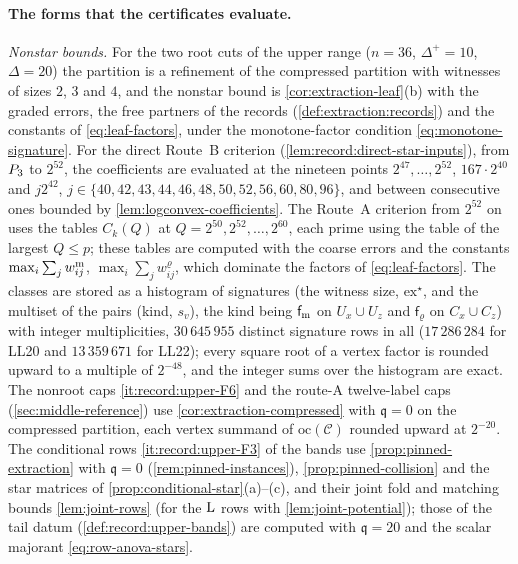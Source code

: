 \paragraph{The forms that the certificates evaluate.}
\emph{Nonstar bounds.} For the two root cuts of the upper range ($n=36$,
$\Delta^+=10$, $\Delta=20$) the partition is a refinement of the compressed
partition with witnesses of sizes $2$, $3$ and $4$, and the nonstar bound is
\cref{cor:extraction-leaf}(b) with the graded errors, the free partners of the
records (\cref{def:extraction:records}) and the constants of \eqref{eq:leaf-factors},
under the monotone-factor condition \eqref{eq:monotone-signature}. For the direct
Route~B criterion (\cref{lem:record:direct-star-inputs}), from $P_3$ to
$2^{52}$, the coefficients are evaluated at the nineteen points $2^{47},\dots,2^{52}$,
$167\cdot2^{40}$ and $j2^{42}$, $j\in\{40,42,43,44,46,48,50,52,56,60,80,96\}$, and
between consecutive ones bounded by \cref{lem:logconvex-coefficients}. The
Route~A criterion from $2^{52}$ on uses the tables $C_k(Q)$ at
$Q=2^{50},2^{52},\dots,2^{60}$, each prime using the table of the largest $Q\le p$;
these tables are computed with the coarse errors and the constants
$\max_i\sum_jw^{\rm m}_{ij}$, $\max_i\sum_jw^\varrho_{ij}$, which dominate the factors of
\eqref{eq:leaf-factors}.
The classes are stored as a histogram of signatures (the witness size,
$\mathrm{ex}^\star$, and the multiset of the pairs (kind, $s_v$), the kind being
$\mathsf f_{\rm m}$ on $U_x\cup U_z$ and $\mathsf f_\varrho$ on $C_x\cup C_z$) with integer
multiplicities, $30\,645\,955$ distinct signature rows in all ($17\,286\,284$ for LL20 and $13\,359\,671$
for LL22); every square root of a vertex factor is rounded upward to a multiple of
$2^{-48}$, and the integer sums over the histogram are exact. The nonroot caps
\ref{it:record:upper-F6} and the route-A twelve-label caps (\cref{sec:middle-reference})
use \cref{cor:extraction-compressed} with $\mathfrak q=0$ on the compressed partition,
each vertex summand of $\mathrm{oc}(\mathcal C)$ rounded upward at $2^{-20}$. The
conditional rows \ref{it:record:upper-F3} of the bands use
\cref{prop:pinned-extraction} with $\mathfrak q=0$ (\cref{rem:pinned-instances}),
\cref{prop:pinned-collision} and the star matrices of
\cref{prop:conditional-star}(a)--(c), and their joint fold and matching bounds
\cref{lem:joint-rows} (for the $\rm L$ rows with \cref{lem:joint-potential}); those of
the tail datum
(\cref{def:record:upper-bands}) are computed with $\mathfrak q=20$ and the scalar
majorant \eqref{eq:row-anova-stars}.
